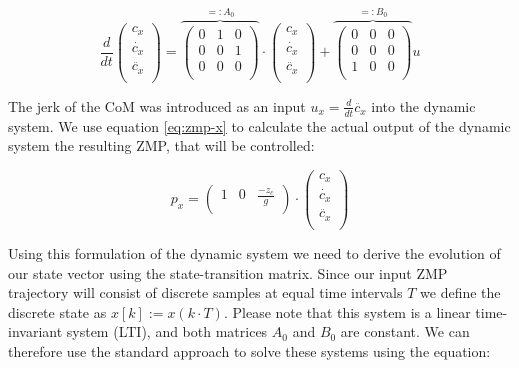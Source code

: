 \documentclass[english,ngerman]{KITreprt}
\begin{document}
\begin{equation} \label{eq:dyn-system}
\frac{d}{dt} \left(\begin{array}{c}
c_x \\
\dot{c_x} \\
\ddot{c_x} \\
\end{array} \right)
=
\overbrace{
\left(\begin{array}{ccc}
0 & 1 & 0\\
0 & 0 & 1 \\
0 & 0 & 0 \\
\end{array}\right)
}^{ =: A_0}
\cdot
\left(\begin{array}{c}
c_x \\
\dot{c_x} \\
\ddot{c_x} \\
\end{array}\right)
+
\overbrace{
\left(\begin{array}{ccc}
0 & 0 & 0\\
0 & 0 & 0\\
1 & 0 & 0\\
\end{array}\right)
}^{ =: B_0}
u
\end{equation}

The jerk of the CoM was introduced as an input
$u_x = \frac{d}{dt} \ddot{c_x}$ into the dynamic system. We use equation
\ref{eq:zmp-x} to calculate the actual output of the dynamic system the
resulting ZMP, that will be controlled:

\begin{equation} \label{eq:zmp-x-output}
p_x =
\left(\begin{array}{ccc}
1 & 0 & \frac{-z_c}{g} \\
\end{array}\right)
\cdot
\left(\begin{array}{c}
c_x \\
\dot{c_x} \\
\ddot{c_x} \\
\end{array}\right)
\end{equation}

Using this formulation of the dynamic system we need to derive the
evolution of our state vector using the state-transition matrix. Since
our input ZMP trajectory will consist of discrete samples at equal time
intervals $T$ we define the discrete state as $x[k] := x(k \cdot T)$.
Please note that this system is a linear time-invariant system (LTI),
and both matrices $A_0$ and $B_0$ are constant. We can therefore use the
standard approach to solve these systems using the equation:
\end{document}
